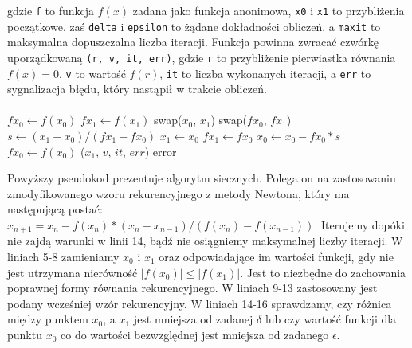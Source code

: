 \documentclass[a4paper]{article}
\begin{document}
gdzie \texttt{f} to funkcja $f(x)$ zadana jako funkcja anonimowa, \texttt{x0} i \texttt{x1} to przybliżenia początkowe, zaś \texttt{delta} i \texttt{epsilon} to żądane dokładności obliczeń, a \texttt{maxit} to maksymalna dopuszczalna liczba iteracji. Funkcja powinna zwracać czwórkę uporządkowaną \texttt{(r, v, it, err)}, gdzie \texttt{r} to przybliżenie pierwiastka równania $f(x) = 0$, \texttt{v} to wartość $f(r)$, \texttt{it} to liczba wykonanych iteracji, a \texttt{err} to sygnalizacja błędu, który nastąpił w trakcie obliczeń.

\paragraph{}
\begin{center}
	\begin{algorithmic}[1]
    	\State $fx_{0}\gets f(x_{0})$
    	\State $fx_{1}\gets f(x_{1})$
    			\State swap($x_{0}$, $x_{1}$)
    			\State swap($fx_{0}$, $fx_{1}$) 
    		\EndIf
    		\State $s\gets (x_{1} - x_{0}) / (fx_{1} - fx_{0})$
    		\State $x_{1}\gets x_{0}$
    		\State $fx_{1}\gets fx_{0}$
    		\State $x_{0}\gets x_{0} - fx_{0} * s$
    		\State $fx_{0}\gets f(x_{0})$
    			\State \Return ($x_{1}$, $v$, $it$, $err$)
    		\EndIf
    	\EndFor
    	\State \Return error
	\EndFunction
	\end{algorithmic}
\end{center}

Powyższy pseudokod prezentuje algorytm siecznych. Polega on na zastosowaniu zmodyfikowanego wzoru rekurencyjnego z metody Newtona, który ma następującą postać: $x_{n+1} = x_{n} - f(x_{n}) * (x_{n} - x_{n-1}) / (f(x_{n}) - f(x_{n-1}))$. Iterujemy dopóki nie zajdą warunki w linii 14, bądź nie osiągniemy maksymalnej liczby iteracji. W liniach 5-8 zamieniamy $x_{0}$ i $x_{1}$ oraz odpowiadające im wartości funkcji, gdy nie jest utrzymana nierówność $|f(x_{0})| \leq |f(x_{1})|$. Jest to niezbędne do zachowania poprawnej formy równania rekurencyjnego. W liniach 9-13 zastosowany jest podany wcześniej wzór rekurencyjny. W liniach 14-16 sprawdzamy, czy różnica między punktem $x_{0}$, a $x_{1}$ jest mniejsza od zadanej $\delta$ lub czy wartość funkcji dla punktu $x_{0}$ co do wartości bezwzględnej jest mniejsza od zadanego $\epsilon$.
\end{document}
